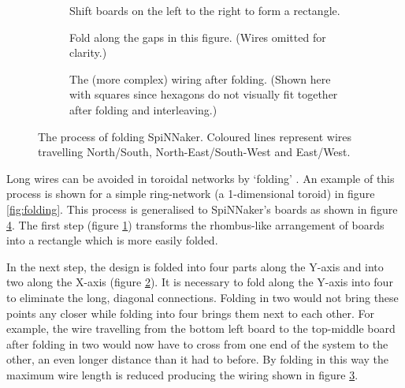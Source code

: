 			\begin{figure}
				\center
				\begin{subfigure}[b]{\textwidth}
					\center
					
					\caption{Shift boards on the left to the right to form a rectangle.}
					\label{fig:boardsFoldedShift}
				\end{subfigure}
				
				\vspace{2ex}
				
				\begin{subfigure}[b]{\textwidth}
					\center
					
					\caption{Fold along the gaps in this figure. (Wires omitted for
					clarity.)}
					\label{fig:boardsFoldedSpaced}
				\end{subfigure}
				
				\vspace{2ex}
				
				\begin{subfigure}[b]{\textwidth}
					\center
					
					\caption{The (more complex) wiring after folding. (Shown here with
					squares since hexagons do not visually fit together after folding and
					interleaving.)}
					\label{fig:boardsFoldedInterleaved}
				\end{subfigure}
				
				\caption[Folding SpiNNaker.]{The process of folding SpiNNaker. Coloured
				lines represent wires travelling {\color{red}North/South},
				{\color{green}North-East/South-West} and {\color{blue}East/West}.}
				\label{fig:boardsFolded}
			\end{figure}
			
			Long wires can be avoided in toroidal networks by `folding'
			\cite{dally04}.  An example of this process is shown for a simple
			ring-network (a 1-dimensional toroid) in figure \ref{fig:folding}. This
			process is generalised to SpiNNaker's boards as shown in figure
			\ref{fig:boardsFolded}. The first step (figure
			\ref{fig:boardsFoldedShift}) transforms the rhombus-like arrangement of
			boards into a rectangle which is more easily folded.
			
			In the next step, the design is folded into four parts along the Y-axis
			and into two along the X-axis (figure \ref{fig:boardsFoldedSpaced}). It is
			necessary to fold along the Y-axis into four to eliminate the long,
			diagonal connections. Folding in two would not bring these points any
			closer while folding into four brings them next to each other. For
			example, the wire travelling from the bottom left board to the top-middle
			board after folding in two would now have to cross from one end of the
			system to the other, an even longer distance than it had to before. By
			folding in this way the maximum wire length is reduced producing the
			wiring shown in figure \ref{fig:boardsFoldedInterleaved}.
			
